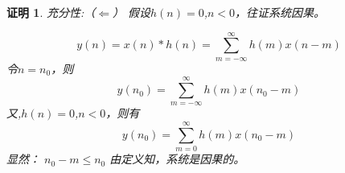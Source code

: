\documentclass[notheorems,compress,mathserif,table]{beamer}
\newtheorem{daproof}{证明}
\begin{document}
\begin{frame}[shrink]\frametitle{}
\begin{daproof}
充分性:（$\Leftarrow$） 假设$h(n)=0$,$n<0$，往证系统因果。

        $$%
        y(n) = x(n) * h(n)%
                =\sum_{m=-\infty}^{\infty}h(m)x(n-m) $$%
            \quad\quad 令$n=n_{0}$，则
        $$y(n_{0})=\sum_{m=-\infty}^{\infty}h(m)x(n_{0}-m)$$%
        \quad\quad 又,\quad$h(n)=0$,$n<0$，则有
        $$y(n_{0}) = \sum_{m=0}^{\infty}h(m)x(n_{0}-m)$$
        \quad\quad 显然： $n_{0}-m \leqslant n_{0}$
        \quad\quad 由定义知，系统是因果的。\par
\end{daproof}
\end{frame}
\end{document}
